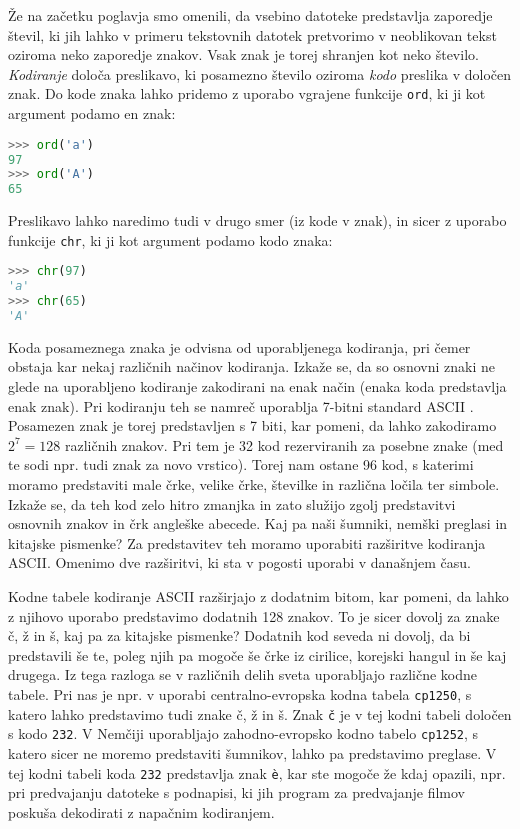 Že na začetku poglavja smo omenili, da vsebino datoteke predstavlja zaporedje števil, ki jih lahko v primeru tekstovnih datotek pretvorimo v neoblikovan tekst oziroma neko zaporedje znakov. Vsak znak je torej shranjen kot neko število. \emph{Kodiranje} določa preslikavo, ki posamezno število oziroma \emph{kodo} preslika v določen znak. Do kode znaka lahko pridemo z uporabo vgrajene funkcije \texttt{ord}, ki ji kot argument podamo en znak:
\begin{lstlisting}[language=Python, showstringspaces=false]
>>> ord('a')
97
>>> ord('A')
65
\end{lstlisting}
Preslikavo lahko naredimo tudi v drugo smer (iz kode v znak), in sicer z uporabo funkcije \texttt{chr}, ki ji kot argument podamo kodo znaka:
\begin{lstlisting}[language=Python, showstringspaces=false]
>>> chr(97)
'a'
>>> chr(65)
'A'
\end{lstlisting}

Koda posameznega znaka je odvisna od uporabljenega kodiranja, pri čemer obstaja kar nekaj različnih načinov kodiranja. Izkaže se, da so osnovni znaki ne glede na uporabljeno kodiranje zakodirani na enak način (enaka koda predstavlja enak znak). Pri kodiranju teh se namreč uporablja 7-bitni standard ASCII . Posamezen znak je torej predstavljen s 7 biti, kar pomeni, da lahko zakodiramo $2^7=128$ različnih znakov. Pri tem je 32 kod rezerviranih za posebne znake (med te sodi npr. tudi znak za novo vrstico). Torej nam ostane 96 kod, s katerimi moramo predstaviti male črke, velike črke, številke in različna ločila ter simbole. Izkaže se, da teh kod zelo hitro zmanjka in zato služijo zgolj predstavitvi osnovnih znakov in črk angleške abecede. Kaj pa naši šumniki, nemški preglasi in kitajske pismenke? Za predstavitev teh moramo uporabiti razširitve kodiranja ASCII. Omenimo dve razširitvi, ki sta v pogosti uporabi v današnjem času. 

Kodne tabele  kodiranje ASCII razširjajo z dodatnim bitom, kar pomeni, da lahko z njihovo uporabo predstavimo dodatnih 128 znakov. To je sicer dovolj za znake č, ž in š, kaj pa za kitajske pismenke? Dodatnih kod seveda ni dovolj, da bi predstavili še te, poleg njih pa mogoče še črke iz cirilice, korejski hangul in še kaj drugega. Iz tega razloga se v različnih delih sveta uporabljajo različne kodne tabele. Pri nas je npr. v uporabi centralno-evropska kodna tabela \texttt{cp1250}, s katero lahko predstavimo tudi znake č, ž in š. Znak \texttt{č} je v tej kodni tabeli določen s kodo \texttt{232}. V Nemčiji uporabljajo zahodno-evropsko kodno tabelo \texttt{cp1252}, s katero sicer ne moremo predstaviti šumnikov, lahko pa predstavimo preglase. V tej kodni tabeli koda \texttt{232} predstavlja znak \texttt{è}, kar ste mogoče že kdaj opazili, npr. pri predvajanju datoteke s podnapisi, ki jih program za predvajanje filmov poskuša dekodirati z napačnim kodiranjem.

